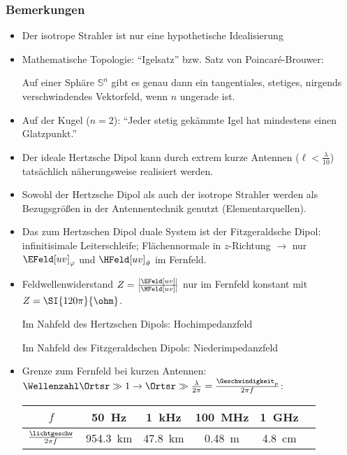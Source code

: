 \begin{frame}
  \frametitle{Bemerkungen}
  \begin{itemize}[<+->]
  \item Der \alert{isotrope Strahler} ist nur eine hypothetische Idealisierung
  \item Mathematische Topologie: \enquote{Igelsatz} bzw. Satz von Poincaré-Brouwer:

    Auf einer Sphäre \(\mathbb{S}^{n}\) gibt es genau dann ein tangentiales, stetiges, nirgends verschwindendes Vektorfeld, wenn \(n\) ungerade ist.

  \item Auf der Kugel (\(n=2\)): \alert{\enquote{Jeder stetig gekämmte Igel hat mindestens einen Glatzpunkt.}}
  \item Der ideale Hertzsche Dipol kann durch extrem kurze Antennen (\(\ell < \frac{\lambda}{10}\)) tatsächlich \alert{näherungsweise} realisiert werden.
  \item Sowohl der Hertzsche Dipol als auch der isotrope Strahler werden als Bezugsgrößen in der Antennentechnik genutzt (\alert{Elementarquellen}).
  \item Das zum Hertzschen Dipol \alert{duale} System ist der \alert{Fitzgeraldsche Dipol}: infinitisimale Leiterschleife; Flächennormale in \(z\)-Richtung \(\to\) nur \(\EFeld[uv]_\varphi\) und \(\HFeld[uv]_\vartheta\) im Fernfeld.
  \item Feldwellenwiderstand \(Z=\frac{|\EFeld[uv]|}{|\HFeld[uv]|}\) nur im Fernfeld konstant mit \(Z=\SI{120\pi}{\ohm}\).

    Im Nahfeld des Hertzschen Dipols: \alert{Hochimpedanzfeld}

    Im Nahfeld des Fitzgeraldschen Dipols: \alert{Niederimpedanzfeld}
  \item \alert{Grenze zum Fernfeld} bei kurzen Antennen: \(\Wellenzahl \Ortsr \gg 1 \to \Ortsr \gg  \frac{\lambda}{2\pi} = \frac{\Geschwindigkeit_p}{2\pi f}\):
    \begin{tabular}{c||c|c|c|c|c}
      $f$ & \SI{50}{\hertz} & \SI{1}{\kilo\hertz} & \SI{100}{\mega\hertz}& \SI{1}{\giga\hertz}\\
      \hline
      $\frac{\lichtgeschw}{2\pi f}$ & \SI{954.3}{\kilo\metre} & \SI{47.8}{\kilo\metre} &\SI{0.48}{\metre} &\SI{4.8}{\centi\metre}
    \end{tabular}
  \end{itemize}
  \ 
  \end{frame}


